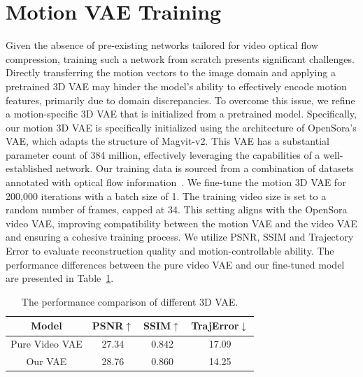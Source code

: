 \section{Motion VAE Training}
Given the absence of pre-existing networks tailored for video optical flow compression, training such a network from scratch presents significant challenges. Directly transferring the motion vectors to the image domain and applying a pretrained 3D VAE may hinder the model's ability to effectively encode motion features, primarily due to domain discrepancies. To overcome this issue, we refine a motion-specific 3D VAE that is initialized from a pretrained model. Specifically,  our motion 3D VAE is specifically initialized using the architecture of OpenSora's VAE, which adapts the structure of Magvit-v2. This VAE has a substantial parameter count of 384 million, effectively leveraging the capabilities of a well-established network.  Our training data is sourced from a combination of datasets annotated with optical flow information~\cite{DBLP:conf/cvpr/MehlSJNB23,DBLP:conf/cvpr/MayerIHFCDB16,DBLP:journals/ijcv/RanjanHTTRB20,DBLP:journals/corr/abs-2001-10773}. We fine-tune the motion 3D VAE for 200,000 iterations with a batch size of 1. The training video size is set to a random number of frames, capped at 34. This setting aligns with the OpenSora video VAE, improving compatibility between the motion VAE and the video VAE and ensuring a cohesive training process. We utilize PSNR, SSIM and Trajectory Error to evaluate reconstruction quality and motion-controllable ability. The performance differences between the pure video VAE and our fine-tuned model are presented in Table~\ref{sup.t.vae}.

\begin{table}[!ht]
\centering
\begin{tabular}{cccc}
\toprule
Model          & PSNR$\uparrow$  & SSIM$\uparrow$  & TrajError$\downarrow$ \\ 
\midrule
Pure Video VAE & 27.34 & 0.842 & 17.09     \\
Our VAE        & 28.76 & 0.860 & 14.25     \\ 
\bottomrule
\end{tabular}
\caption{The performance comparison of different 3D VAE.}
\label{sup.t.vae} 
\end{table}
